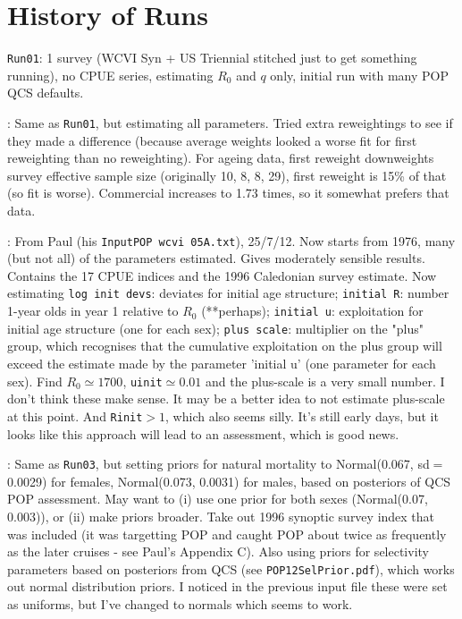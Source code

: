 
\section*{History of Runs}

{\tt Run01}: 1 survey (WCVI Syn + US Triennial stitched just to get something running), no CPUE series, estimating $R_0$ and $q$ only, initial run with many POP QCS defaults. \newline  

: Same as {\tt Run01}, but estimating all parameters. Tried extra reweightings to see if they made a difference (because average weights looked a worse fit for first reweighting than no reweighting). For ageing data, first reweight downweights survey effective sample size (originally 10, 8, 8, 29), first reweight is 15\% of that (so fit is worse). Commercial increases to 1.73 times, so it somewhat prefers that data. \newline

: From Paul (his {\tt InputPOP wcvi 05A.txt}), 25/7/12. Now starts from 1976, many (but not all) of the parameters estimated. Gives moderately sensible results. Contains the 17 CPUE indices and the 1996 Caledonian survey estimate. Now estimating {\tt log init devs}: deviates for initial age structure; {\tt initial R}: number 1-year olds in year 1 relative to $R_0$ (**perhaps); {\tt initial u}: exploitation for initial age structure (one for each sex); {\tt plus scale}: multiplier on the "plus" group, which recognises that the cumulative exploitation on the plus group will exceed the estimate made by the parameter 'initial u' (one parameter for each sex). Find $R_0 \simeq 1700$, {\tt uinit}$\simeq 0.01$ and the plus-scale is a very small number. I don't think these make sense.  It may be a better idea to not estimate plus-scale at this point.  And {\tt Rinit}$>1$, which also seems silly. It's still early days, but it looks like this approach will lead to an assessment, which is good news. \newline

: Same as {\tt Run03}, but setting priors for natural mortality to Normal(0.067, sd$=$0.0029) for females, Normal(0.073, 0.0031) for males, based on posteriors of QCS POP assessment. May want to (i) use one prior for both sexes (Normal(0.07, 0.003)), or (ii) make priors broader. Take out 1996 synoptic survey index that was included (it was targetting POP and caught POP about twice as frequently as the later cruises - see Paul's Appendix C). Also using priors for selectivity parameters based on posteriors from QCS (see {\tt POP12SelPrior.pdf}), which works out normal distribution priors. I noticed in the previous input file these were set as uniforms, but I've changed to normals which seems to work. \newline

